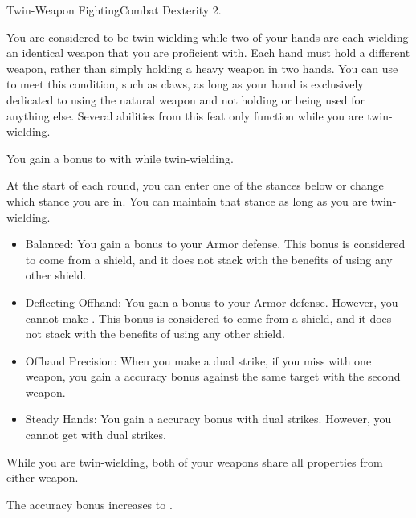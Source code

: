     \begin{feat}{Twin-Weapon Fighting}{Combat}
        \featpre Dexterity 2.

         You are considered to be twin-wielding while two of your hands are each wielding an identical weapon that you are proficient with.
        Each hand must hold a different weapon, rather than simply holding a heavy weapon in two hands.
        You can use  to meet this condition, such as claws, as long as your hand is exclusively dedicated to using the natural weapon and not holding or being used for anything else.
        Several abilities from this feat only function while you are twin-wielding.

         You gain a  bonus to  with  while twin-wielding.

         At the start of each round, you can enter one of the stances below or change which stance you are in.
        You can maintain that stance as long as you are twin-wielding.
        \begin{itemize}
            \item Balanced: You gain a  bonus to your Armor defense.
                This bonus is considered to come from a shield, and it does not stack with the benefits of using any other shield.
            \item Deflecting Offhand: You gain a  bonus to your Armor defense.
                However, you cannot make .
                This bonus is considered to come from a shield, and it does not stack with the benefits of using any other shield.
            \item Offhand Precision: When you make a dual strike, if you miss with one weapon, you gain a  accuracy bonus against the same target with the second weapon.
            \item Steady Hands: You gain a  accuracy bonus with dual strikes.
                However, you cannot get  with dual strikes.
        \end{itemize}

         While you are twin-wielding, both of your weapons share all \magical properties from either weapon.

         The accuracy bonus increases to .
    \end{feat}

